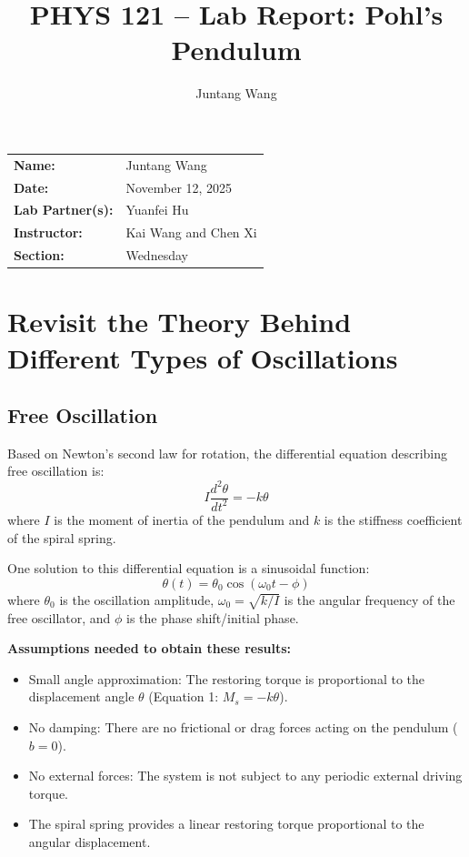 \documentclass[12pt]{article}
\title{PHYS 121 -- Lab Report: Pohl's Pendulum}
\author{Juntang Wang}
\date{}
\begin{document}


\maketitle

\begin{center}
\begin{tabular}{ll}
\textbf{Name:} & Juntang Wang \\
\textbf{Date:} & November 12, 2025 \\
\textbf{Lab Partner(s):} & Yuanfei Hu \\
\textbf{Instructor:} & Kai Wang and Chen Xi \\
\textbf{Section:} & Wednesday \\
\end{tabular}
\end{center}

\vspace{0.5in}

\section{Revisit the Theory Behind Different Types of Oscillations}

\subsection{Free Oscillation}

Based on Newton's second law for rotation, the differential equation describing free oscillation is:
\begin{equation}
I \frac{d^2\theta}{dt^2} = -k\theta
\end{equation}
where $I$ is the moment of inertia of the pendulum and $k$ is the stiffness coefficient of the spiral spring.

One solution to this differential equation is a sinusoidal function:
\begin{equation}
\theta(t) = \theta_0 \cos(\omega_0 t - \phi)
\end{equation}
where $\theta_0$ is the oscillation amplitude, $\omega_0 = \sqrt{k/I}$ is the angular frequency of the free oscillator, and $\phi$ is the phase shift/initial phase.

\textbf{Assumptions needed to obtain these results:}
\begin{itemize}[leftmargin=*]
\item Small angle approximation: The restoring torque is proportional to the displacement angle $\theta$ (Equation 1: $M_s = -k\theta$).
\item No damping: There are no frictional or drag forces acting on the pendulum ($b = 0$).
\item No external forces: The system is not subject to any periodic external driving torque.
\item The spiral spring provides a linear restoring torque proportional to the angular displacement.
\end{itemize}
\end{document}
